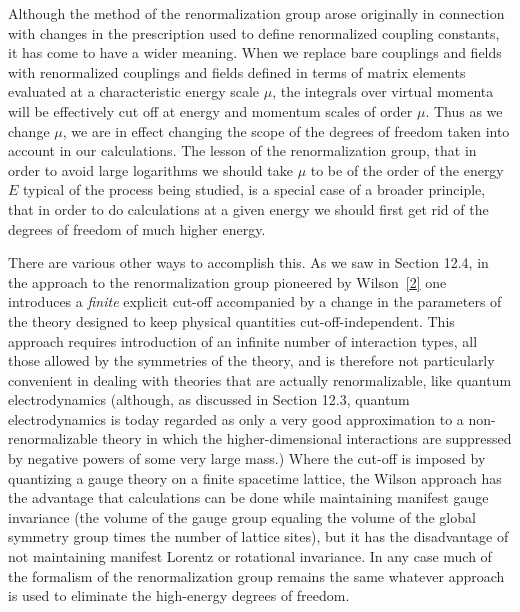 Although the method of the renormalization group arose originally in
connection with changes in the prescription used to define renormalized
coupling constants, it has come to have a wider meaning. When we replace bare
couplings and fields with renormalized couplings and fields defined in terms
of matrix elements evaluated at a characteristic energy scale $\mu$, the
integrals over virtual momenta will be effectively cut off at energy and
momentum scales of order $\mu$. Thus as we change $\mu$, we are in effect
changing the scope of the degrees of freedom taken into account in our
calculations. The lesson of the renormalization group, that in order to avoid
large logarithms we should take $\mu$ to be of the order of the energy $E$
typical of the process being studied, is a special case of a broader
principle, that in order to do calculations at a given energy we should first
get rid of the degrees of freedom of much higher energy.

There are various other ways to accomplish this. As we saw in Section 12.4,
in the approach to the renormalization group pioneered by
Wilson~\hyperref[ch18-ref-2]{[2]} one introduces a \emph{finite} explicit cut-off
accompanied by a change in the parameters of the theory designed to keep
physical quantities cut-off-independent. This approach requires introduction
of an infinite number of interaction types, all those allowed by the
symmetries of the theory, and is therefore not particularly convenient in
dealing with theories that are actually renormalizable, like quantum
electrodynamics (although, as discussed in Section 12.3, quantum
electrodynamics is today regarded as only a very good approximation to a
non-renormalizable theory in which the higher-dimensional interactions are
suppressed by negative powers of some very large mass.) Where the cut-off is
imposed by quantizing a gauge theory on a finite spacetime lattice, the Wilson
approach has the advantage that calculations can be done while maintaining
manifest gauge invariance (the volume of the gauge group equaling the volume
of the global symmetry group times the number of lattice sites), but it has
the disadvantage of not maintaining manifest Lorentz or rotational
invariance. In any case much of the formalism of the renormalization group
remains the same whatever approach is used to eliminate the high-energy
degrees of freedom.
